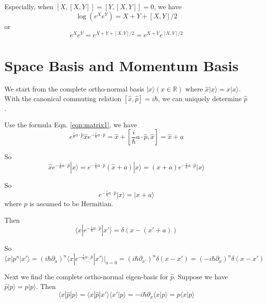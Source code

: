 \documentclass[12pt]{book}
\begin{document}
	Especially, when $[X,[X,Y]]=[Y,[X,Y]]=0$, we have
	\begin{equation}
		\log(e^Xe^Y)=X+Y+[X,Y]/2
	\end{equation}
	or
	\begin{equation}
		e^Xe^Y=e^{X+Y+[X,Y]/2}=e^{X+Y}e^{   [X,Y]/2}
	\end{equation}
	
	
	\section{Space Basis and Momentum Basis}
	
	We start from the complete ortho-normal basis $|x\rangle(x\in\mathbb R)$ where $\hat x|x\rangle=x|x\rangle$. With the canonical commuting relation $[\hat x,\hat p]=i\hbar$, we can uniquely determine $\hat p$.
	
	Use the formula Eqn. \ref{eqn:matrix1}, we have
	\begin{equation}
		e^{\frac i\hbar a\cdot\hat p}\hat x e^{-\frac i\hbar a\cdot\hat p}=\hat x+ [\frac i\hbar a\cdot\hat p,\hat x]=\hat x+a
	\end{equation}
	
	So
	\begin{equation}
		\hat x e^{-\frac i\hbar a\cdot\hat p}|x\rangle=e^{-\frac i\hbar a\cdot\hat p}(\hat x+a)|x\rangle=(x+a)e^{-\frac i\hbar a\cdot\hat p}|x\rangle
	\end{equation}
	
	So
	\begin{equation}
		e^{-\frac i\hbar a\cdot\hat p}|x\rangle=|x+a\rangle
	\end{equation}
	where $\hat p$ is assumed to be Hermitian.
	
	Then
	\begin{equation}
		\langle x|e^{-\frac i\hbar a\cdot\hat p}|x'\rangle=\delta(x-(x'+a))
	\end{equation}
	
	So 
	\begin{equation}
		\langle x|p^n|x'\rangle=(i\hbar\partial_a)^n\langle x|e^{-\frac i\hbar a\cdot\hat p}|x'\rangle|_{a=0}=(i\hbar\partial_{x'})^n\delta(x-x')=(-i\hbar\partial_x)^n\delta(x-x')
	\end{equation}
	
	Next we find the complete ortho-normal eigen-basis for $\hat p$. Suppose we have $\hat p|p\rangle=p|p\rangle$. Then
	\begin{equation}
		\langle x|\hat p|p\rangle=\langle x|\hat p|x'\rangle\langle x'|p\rangle=-i\hbar\partial_x\langle x|p\rangle=p\langle x|p\rangle
	\end{equation}
\end{document}
